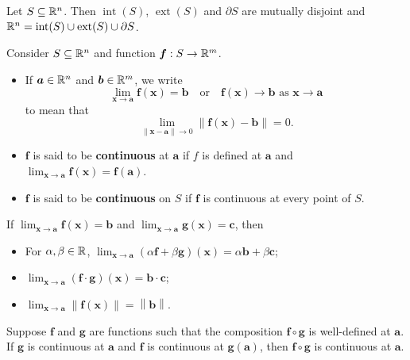     \begin{propositionenv}
        Let $S\subseteq \mathbb{R}^n$. Then $\operatorname{int}(S)$, $\operatorname{ext}(S)$ and $\partial S$ are mutually disjoint and $\mathbb{R}^n = \operatorname{int}(S) \cup \operatorname{ext}(S) \cup \partial S$.
    \end{propositionenv}
    \begin{definitionenv}
        Consider $S \subseteq \mathbb{R}^n$ and function $\bm f:S\to \mathbb{R}^m$. 
        \begin{itemize}
            \item If $\bm a\in \mathbb{R}^n$ and $\bm b \in \mathbb{R}^m$, we write $$ \lim_{\bm x \to \bm a} \bm f(\bm x) = \bm b \quad \text{or} \quad \bm f(\bm x) \to \bm b \text{ as } \bm x \to \bm a $$ to mean that $$ \lim_{\left\|\bm x - \bm a\right\| \to 0} \left\|\bm f(\bm x) - \bm b\right\| = 0. $$
            \item $\bm f$ is said to be \textbf{continuous} at $\bm a$ if $f$ is defined at $\bm a$ and $\displaystyle \lim_{\bm x \to \bm a} \bm f(\bm x) = \bm f(\bm a)$.
            \item $\bm f$ is said to be \textbf{continuous} on $S$ if $\bm f$ is continuous at every point of $S$.
        \end{itemize}
    \end{definitionenv}
    \begin{theoremenv}
        If $\displaystyle \lim_{\bm x \to \bm a} \bm f(\bm x) = \bm b$ and $\displaystyle \lim_{\bm x \to \bm a} \bm g(\bm x) = \bm c$, then
        \begin{itemize}
            \item For $\alpha, \beta \in \mathbb{R}$, $\displaystyle \lim_{\bm x \to \bm a} (\alpha \bm f + \beta \bm g)(\bm x) = \alpha \bm b + \beta \bm c$;
            \item $\displaystyle \lim_{\bm x \to \bm a} (\bm f \cdot \bm g)(\bm x) = \bm b \cdot \bm c$;
            \item $\displaystyle \lim_{\bm x \to \bm a} \left\|\bm f (\bm x) \right\| = \left\|\bm b\right\|$.
        \end{itemize}
    \end{theoremenv}
    \begin{theoremenv}
        Suppose $\bm f$ and $\bm g$ are functions such that the composition $\bm f \circ \bm g$ is well-defined at $\bm a$. If $\bm g$ is continuous at $\bm a$ and $\bm f$ is continuous at $\bm g(\bm a)$, then $\bm f \circ \bm g$ is continuous at $\bm a$.
    \end{theoremenv}
